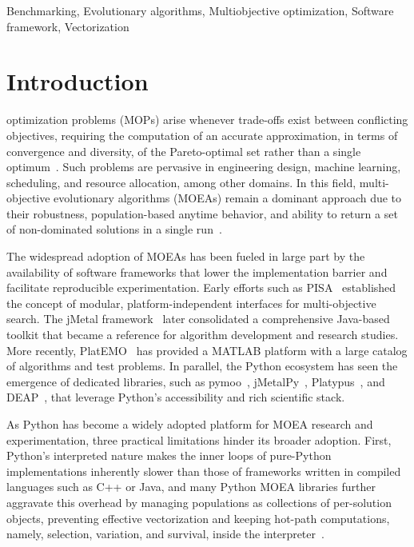 \documentclass[journal]{IEEEtran}
\begin{document}
\begin{IEEEkeywords}
Benchmarking, Evolutionary algorithms, Multiobjective optimization,
Software framework, Vectorization
\end{IEEEkeywords}

\IEEEpeerreviewmaketitle

\section{Introduction}
\label{sec:intro}

 optimization problems (MOPs) arise whenever trade-offs exist between conflicting objectives, requiring the computation of an accurate approximation, in terms of convergence and diversity, of the Pareto-optimal set rather than a single optimum~\cite{deb01}. Such problems are pervasive in engineering design, machine learning, scheduling, and resource allocation, among other domains. In this field, multi-objective evolutionary algorithms (MOEAs) remain a dominant approach due to their robustness, population-based anytime behavior, and ability to return a set of non-dominated solutions in a single run~\cite{CLV07}.

The widespread adoption of MOEAs has been fueled in large part by the availability of software frameworks that lower the implementation barrier and facilitate reproducible experimentation. Early efforts such as PISA~\cite{BLT+03} established the concept of modular, platform-independent interfaces for multi-objective search. The jMetal framework~\cite{DN11} later consolidated a comprehensive Java-based toolkit that became a reference for algorithm development and research studies. More recently, PlatEMO~\cite{TCZ+17} has provided a MATLAB platform with a large catalog of algorithms and test problems. In parallel, the Python ecosystem has seen the emergence of dedicated libraries, such as pymoo~\cite{BD20}, jMetalPy~\cite{BNG+19}, Platypus~\cite{hadka15}, and DEAP~\cite{FDG+12}, that leverage Python's accessibility and rich scientific stack. 

As Python has become a widely adopted platform for MOEA research and experimentation, three practical limitations hinder its broader adoption. First, Python's interpreted nature makes the inner loops of pure-Python implementations inherently slower than those of frameworks written in compiled languages such as C++ or Java, and many Python MOEA libraries further aggravate this overhead by managing populations as collections of per-solution objects, preventing effective vectorization and keeping hot-path computations, namely, selection, variation, and survival, inside the interpreter~\cite{BNG+19,FDG+12,hadka15}.
\end{document}

